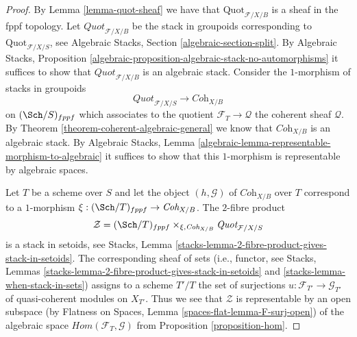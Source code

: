 \begin{proof}
By Lemma \ref{lemma-quot-sheaf}
we have that $\text{Quot}_{\mathcal{F}/X/B}$ is a sheaf in the
fppf topology. Let $\textit{Quot}_{\mathcal{F}/X/B}$ be the stack in
groupoids corresponding to $\text{Quot}_{\mathcal{F}/X/S}$, see
Algebraic Stacks, Section \ref{algebraic-section-split}.
By Algebraic Stacks, Proposition
\ref{algebraic-proposition-algebraic-stack-no-automorphisms}
it suffices to show that $\textit{Quot}_{\mathcal{F}/X/B}$
is an algebraic stack.
Consider the $1$-morphism of stacks in groupoids
$$
\textit{Quot}_{\mathcal{F}/X/S}
\longrightarrow
\textit{Coh}_{X/B}
$$
on $(\Sch/S)_{fppf}$ which associates to the quotient
$\mathcal{F}_T \to \mathcal{Q}$ the coherent sheaf $\mathcal{Q}$.
By Theorem \ref{theorem-coherent-algebraic-general} we know that
$\textit{Coh}_{X/B}$ is an algebraic stack.
By Algebraic Stacks, Lemma
\ref{algebraic-lemma-representable-morphism-to-algebraic}
it suffices to show that this $1$-morphism is representable
by algebraic spaces.

\medskip\noindent
Let $T$ be a scheme over $S$ and let the object $(h, \mathcal{G})$ of
$\textit{Coh}_{X/B}$ over $T$ correspond
to a $1$-morphism $\xi : (\Sch/T)_{fppf} \to \textit{Coh}_{X/B}$.
The $2$-fibre product
$$
\mathcal{Z} =
(\Sch/T)_{fppf}
\times_{\xi, \textit{Coh}_{X/B}}
\textit{Quot}_{\mathcal{F}/X/S}
$$
is a stack in setoids, see
Stacks, Lemma \ref{stacks-lemma-2-fibre-product-gives-stack-in-setoids}.
The corresponding sheaf of sets (i.e., functor, see
Stacks, Lemmas
\ref{stacks-lemma-2-fibre-product-gives-stack-in-setoids} and
\ref{stacks-lemma-when-stack-in-sets}) assigns to a scheme
$T'/T$ the set of surjections $u : \mathcal{F}_{T'} \to \mathcal{G}_{T'}$
of quasi-coherent modules on $X_{T'}$. Thus we see that
$\mathcal{Z}$ is representable by an open subspace
(by Flatness on Spaces, Lemma \ref{spaces-flat-lemma-F-surj-open})
of the algebraic space
$\mathit{Hom}(\mathcal{F}_T, \mathcal{G})$ from
Proposition \ref{proposition-hom}.
\end{proof}

